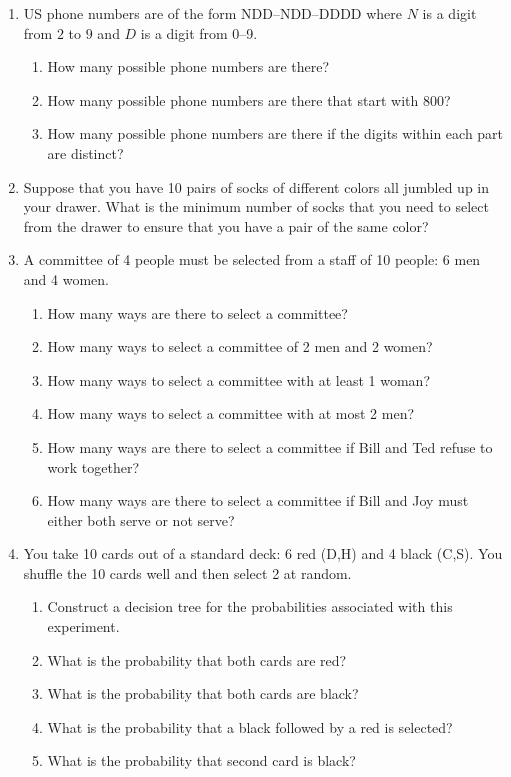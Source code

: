 \documentclass[letterpaper,12pt,fleqn]{article}
\begin{document}
\begin{enumerate}[left=0in]
\item US phone numbers are of the form NDD--NDD--DDDD where \(N\) is a digit from \(2\) to \(9\) and
  \(D\) is a digit from 0--9.
  \begin{enumerate}
  \item How many possible phone numbers are there?
  \item How many possible phone numbers are there that start with \(800\)?
  \item How many possible phone numbers are there if the digits within each part are distinct?
  \end{enumerate}

\item Suppose that you have 10 pairs of socks of different colors all jumbled up in your drawer.  What is the
  minimum number of socks that you need to select from the drawer to ensure that you have a pair of the same
  color?

\item A committee of 4 people must be selected from a staff of 10 people: 6 men and 4 women.
  \begin{enumerate}
  \item How many ways are there to select a committee?
  \item How many ways to select a committee of 2 men and 2 women?
  \item How many ways to select a committee with at least 1 woman?
  \item How many ways to select a committee with at most 2 men?
  \item How many ways are there to select a committee if Bill and Ted refuse to work together?
  \item How many ways are there to select a committee if Bill and Joy must either both serve or not serve?
  \end{enumerate}

\item You take 10 cards out of a standard deck: 6 red (D,H) and 4 black (C,S).  You shuffle the 10 cards well and
  then select 2 at random.
  \begin{enumerate}
  \item Construct a decision tree for the probabilities associated with this experiment.
  \item What is the probability that both cards are red?
  \item What is the probability that both cards are black?
  \item What is the probability that a black followed by a red is selected?
  \item What is the probability that second card is black?
  \end{enumerate}


\end{enumerate}
\end{document}
